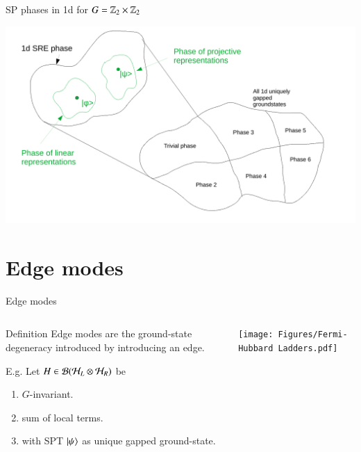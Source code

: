 \documentclass{beamer}
\begin{document}
\begin{frame}{SP phases in 1d for $G=\mathbb{Z}_2\times \mathbb{Z}_2$}
	\begin{center}
		\includegraphics[width=\linewidth]{Figures/SPT_Phases_1d.pdf}
	\end{center}
\end{frame}

\section{Edge modes}

\begin{frame}{Edge modes}
	\begin{columns}
		\begin{column}{0.6\textwidth}
			\begin{block}{Definition}
				Edge modes are the ground-state degeneracy introduced by introducing an edge.
			\end{block}
			\pause
			E.g. Let $H\in\mathcal{B}(\mathcal{H}_L\otimes\mathcal{H}_R)$ be
			\begin{enumerate}
				\item $G$-invariant.
				\item sum of local terms.
				\item with SPT $\ket{\psi}$ as unique gapped ground-state.
			\end{enumerate}
		\end{column}
		\begin{column}{0.4\textwidth}  %
			\begin{center}
				\texttt{[image: Figures/Fermi-Hubbard Ladders.pdf]}
			\end{center}
		\end{column}
	\end{columns}
\end{frame}
\end{document}
